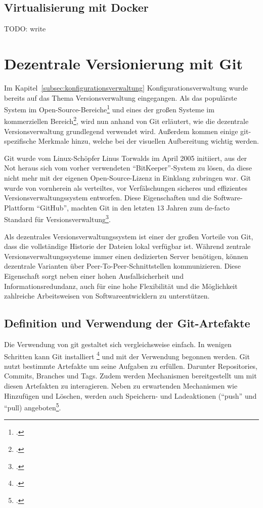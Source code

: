 \subsection{Virtualisierung mit Docker}

TODO: write

\section{Dezentrale Versionierung mit Git}

Im Kapitel~\ref{subsec:konfigurationsverwaltung} Konfigurationsverwaltung wurde bereits auf das Thema Versionsverwaltung 
eingegangen. Als das populärste System im Open-Source-Bereiche\footcite{openhub-pie-chart} und eines der großen Systeme 
im kommerziellen Bereich\footcite{g2crowd2018}, wird nun anhand von Git erläutert, wie die dezentrale Versionsverwaltung 
grundlegend verwendet wird. Außerdem kommen einige git-spezifische Merkmale hinzu, welche bei der visuellen Aufbereitung 
wichtig werden.

Git wurde vom Linux-Schöpfer Linus Torwalds im April 2005 initiiert, aus der Not heraus sich vom vorher verwendeten 
``BitKeeper''-System zu lösen, da diese nicht mehr mit der eigenen Open-Source-Lizenz in Einklang zubringen war. Git 
wurde von vornherein als verteiltes, vor Verfälschungen sicheres und effizientes Versionsverwaltungssystem entworfen. 
Diese Eigenschaften und die Software-Plattform ``GitHub'', machten Git in den letzten 13 Jahren zum de-facto Standard für 
Versionsverwaltung\footcite{heise-torvald-git2015}.

Als dezentrales Versionsverwaltungssystem ist einer der großen Vorteile von Git, dass die vollständige Historie der 
Dateien lokal verfügbar ist. Während zentrale Versionsverwaltungssysteme immer einen dedizierten Server benötigen, können 
dezentrale Varianten über Peer-To-Peer-Schnittstellen kommunizieren. Diese Eigenschaft sorgt neben einer hohen 
Ausfallsicherheit und Informationsredundanz, auch für eine hohe Flexibilität und die Möglichkeit zahlreiche Arbeitsweisen 
von Softwareentwicklern zu unterstützen.

\subsection{Definition und Verwendung der Git-Artefakte}

Die Verwendung von git gestaltet sich vergleichsweise einfach. In wenigen Schritten kann Git installiert \footcite{git-scm-install} und mit der Verwendung begonnen werden. 
Git nutzt bestimmte Artefakte um seine Aufgaben zu erfüllen. Darunter Repositories, Commits, Branches und Tags. Zudem 
werden Mechanismen bereitgestellt um mit diesen Artefakten zu interagieren. Neben zu erwartenden Mechanismen wie 
Hinzufügen und Löschen, werden auch Speichern- und Ladeaktionen (``push'' und ``pull) angeboten\footcite{git-essentials-2017}.

